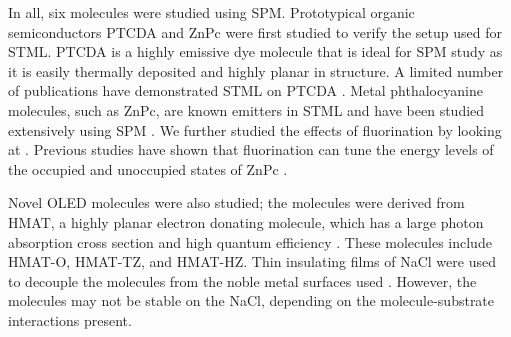In all, six molecules were studied using \ac{SPM}. Prototypical organic semiconductors \acf{PTCDA} and \acf{ZnPc} were first studied to verify the setup used for \ac{STML}. PTCDA is a highly emissive dye molecule that is ideal for \ac{SPM} study as it is easily thermally deposited and highly planar in structure. A limited number of publications have demonstrated \ac{STML} on \ac{PTCDA} \citep{Cottin2018,Rzeznicka2011,Kimura2019}. Metal phthalocyanine molecules, such as ZnPc, are known emitters in \ac{STML} and have been studied extensively using \ac{SPM} \citep{Imada2016,Zhang2016,Doppagne2017,Miwa2019,cochrane2018molecularly,Kaiser2019,zhang2017sub,Cottin2018}. We further studied the effects of fluorination by looking at . Previous studies have shown that fluorination can tune the energy levels of the occupied and unoccupied states of ZnPc \citep{schwarze2016band}. 

Novel \ac{OLED} molecules were also studied; the molecules were derived from \acf{HMAT}, a highly planar electron donating molecule, which has a large photon absorption cross section and high quantum efficiency \citep{Paisley2020,Tonge2020,Chen2017}. These molecules include \acf{HMAT-O}, \acf{HMAT-TZ}, and \acf{HMAT-HZ}. Thin insulating films of NaCl were used to decouple the molecules from the noble metal surfaces used \citep{repp2005molecules}. However, the molecules may not be stable on the NaCl, depending on the molecule-substrate interactions present.



